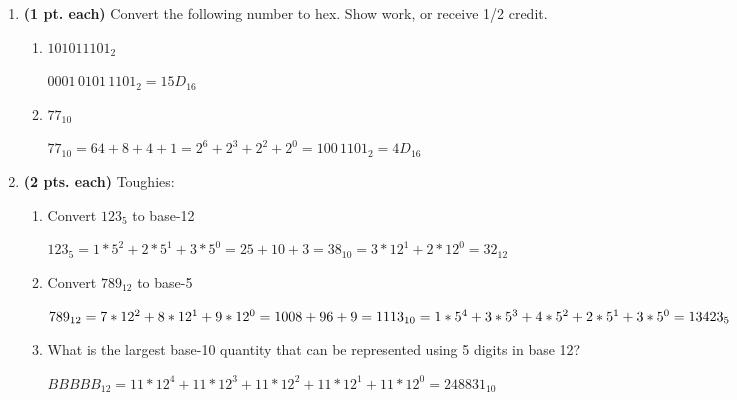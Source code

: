 \begin{enumerate}
\begin{enumerate}
        \end{enumerate}


    \item \textbf{ (1 pt. each)} Convert the following number to hex. Show work, or receive 1/2 credit.
        \begin{enumerate}

            \item $101011101_2$
                \begin{onlysolution}    {\color{blue} \itshape$0001\, 0101\, 1101_2 = 15D_{16}$}
                \end{onlysolution}

            \item $77_{10}$
                \begin{onlysolution}    \itshape $77_{10} = 64+8+4+1=2^6+2^3+2^2+2^0=100\, 1101_2=4D_{16}$
                \end{onlysolution}

        \end{enumerate}


    \item \textbf{ (2 pts. each)} Toughies:
        \begin{enumerate}
            \item Convert $123_5$ to base-12
                \begin{onlysolution}     \itshape
                    $123_5 = 1*5^2 + 2*5^1 + 3*5^0 = 25+10+3=38_{10}=
                    3*12^1 + 2*12^0 = 32_{12}$
                \end{onlysolution}

            \item Convert $789_{12}$ to base-5
                \begin{onlysolution}
                    \itshape    $789_{12} = 7*12^2+8*12^1+9*12^0=1008+96+9=1113_{10}= \\
                    1*5^4+3*5^3 + 4*5^2 + 2*5^1 + 3*5^0 = 13423_5$
                \end{onlysolution}

            \item What is the largest base-10 quantity that can be represented
                using 5 digits in base 12?

                \begin{onlysolution}
                    \itshape $BBBBB_{12} = 11*12^4+11*12^3+11*12^2+11*12^1+11*12^0=248831_{10}$
                \end{onlysolution}


\end{enumerate}
\end{enumerate}
